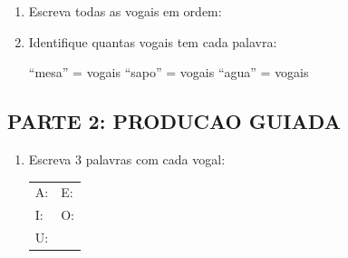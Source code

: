 \begin{exercicio}
\begin{enumerate}
  \item Escreva todas as vogais em ordem:
  \begin{center}
  \underline{\hspace{1cm}} \quad \underline{\hspace{1cm}} \quad \underline{\hspace{1cm}} \quad \underline{\hspace{1cm}} \quad \underline{\hspace{1cm}}
  \end{center}

  \item Identifique quantas vogais tem cada palavra:
  \begin{center}
  ``mesa'' = \underline{\hspace{0.5cm}} vogais \quad ``sapo'' = \underline{\hspace{0.5cm}} vogais \quad ``agua'' = \underline{\hspace{0.5cm}} vogais
  \end{center}
\end{enumerate}

\subsection*{PARTE 2: PRODUCAO GUIADA}

\begin{enumerate}[resume]
  \item Escreva 3 palavras com cada vogal:
  \begin{center}
  \begin{tabular}{ll}
  A: \underline{\hspace{1.8cm}} \underline{\hspace{1.8cm}} \underline{\hspace{1.8cm}} &
  E: \underline{\hspace{1.8cm}} \underline{\hspace{1.8cm}} \underline{\hspace{1.8cm}} \\[1em]
  I: \underline{\hspace{1.8cm}} \underline{\hspace{1.8cm}} \underline{\hspace{1.8cm}} &
  O: \underline{\hspace{1.8cm}} \underline{\hspace{1.8cm}} \underline{\hspace{1.8cm}} \\[1em]
  U: \underline{\hspace{1.8cm}} \underline{\hspace{1.8cm}} \underline{\hspace{1.8cm}} &
  \end{tabular}
  \end{center}


\end{enumerate}
\end{exercicio}

